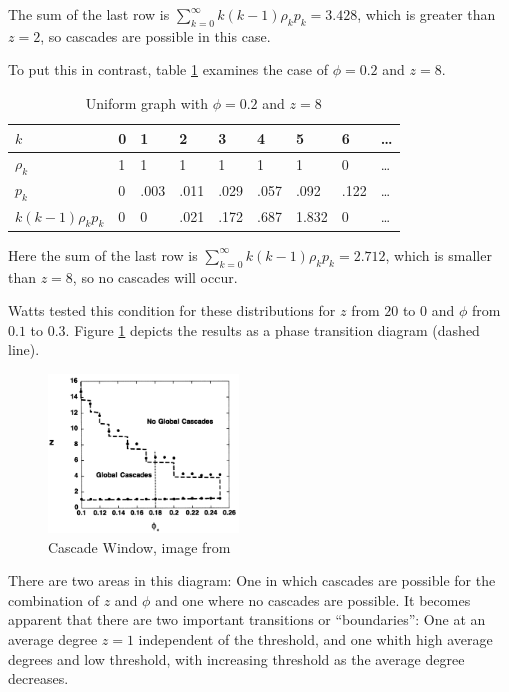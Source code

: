 \documentclass{sig-alternate-05-2015}
\begin{document}
The sum of the last row is $\sum_{k=0}^\infty k (k-1) \rho_k p_k = 3.428$, which is greater than $z = 2$, so cascades are possible in this case.

To put this in contrast, table \ref{tab:z8} examines the case of $\phi = 0.2$ and $z = 8$.

\begin{table}
\centering
\caption{Uniform graph with $\phi = 0.2$ and $z = 8$}
\label{tab:z8}
\begin{tabular}{|l|l|l|l|l|l|l|l|l|}
\hline
$k$                       & 0  & 1     & 2     & 3     & 4     & 5      & 6     & \ldots\\ \hline
$\rho_k$                  & 1  & 1     & 1     & 1     & 1     & 1      & 0     & \ldots\\ \hline
$p_k$                     & 0  & .003  & .011  & .029  & .057  & .092   & .122  & \ldots\\ \hline
$k (k-1) \rho_k p_k$      & 0  & 0     & .021  & .172  & .687  & 1.832  & 0     & \ldots\\ \hline
\end{tabular}
\end{table}

Here the sum of the last row is $\sum_{k=0}^\infty k (k-1) \rho_k p_k = 2.712$, which is smaller than $z = 8$, so no cascades will occur.

Watts tested this condition for these distributions for $z$ from $20$ to $0$ and $\phi$ from $0.1$ to $0.3$. Figure \ref{fig:cascade-window} depicts the results as a phase transition diagram (dashed line).

\begin{figure}[h!]
  \centering
  \includegraphics[width=0.45\textwidth]{img/cascade-regimes-with-cross-section.png}
  \caption{Cascade Window, image from \cite{simplemodel}}
  \label{fig:cascade-window}
\end{figure}

There are two areas in this diagram: One in which cascades are possible for the combination of $z$ and $\phi$ and one where no cascades are possible. It becomes apparent that there are two important transitions or ``boundaries'': One at an average degree $z = 1$ independent of the threshold, and one whith high average degrees and low threshold, with increasing threshold as the average degree decreases.
\end{document}
